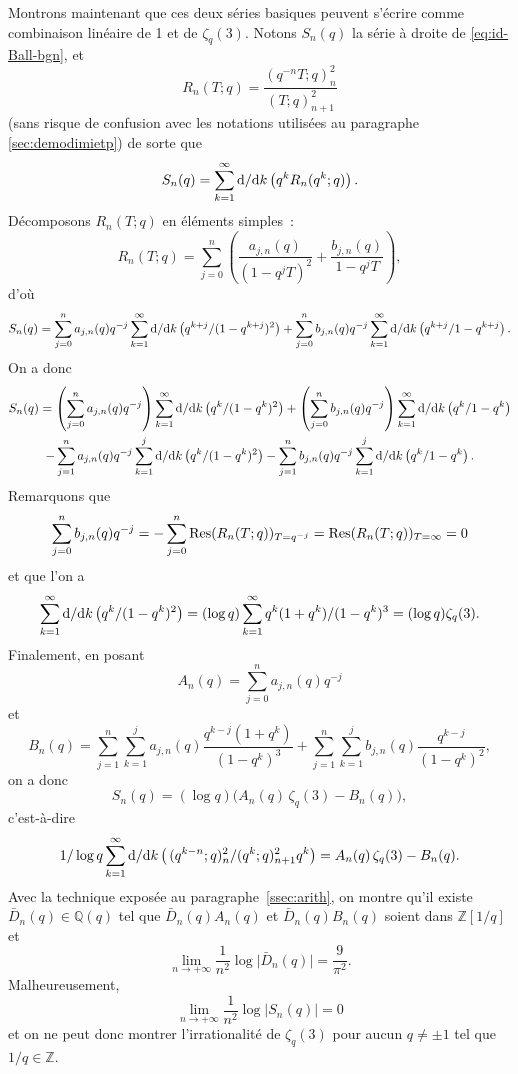 \documentclass[12pt]{amsart}
\newcommand{\io}{\infty}
\newcommand{\dd}{\textup{d}}
\theoremstyle{remark}
\numberwithin{equation}{section}
\begin{document}
Montrons maintenant que ces deux s{\'e}ries basiques peuvent s'{\'e}crire 
comme combinaison lin{\'e}aire de 1 et de $\zeta_q(3)$. Notons 
 $S_n(q)$ la s{\'e}rie {\`a} droite de \eqref{eq:id-Ball-bgn},
et 
$$
R_n(T ; q)= \frac{(q^{-n}T ; q)_n^2}{(T ; q)_{n+1}^2}
$$
(sans risque de confusion avec les notations 
utilis{\'e}es au paragraphe \ref{sec:demodimietp}) 
de sorte que 
$$
S_n(q)=
\sum_{k=1}^{\io}\frac{\dd }{\dd k}\left(q^kR_n(q^k ; q)\right).
$$
D{\'e}composons $R_n(T ; q)$ en {\'e}l{\'e}ments simples~: 
$$
R_n(T ; q)=\sum_{j=0}^n\left(\frac{a_{j,n}(q)}{(1-q^jT)^2}+\frac{b_{j,n}(q)}{1-q^jT}\right),
$$
d'o{\`u} 
$$
S_n(q)=\sum_{j=0}^n a_{j,n}(q) q^{-j}\sum_{k=1}^{\io} \frac{\dd }{\dd
    k}\left(\frac{q^{k+j}}{(1-q^{k+j})^2}\right)+
\sum_{j=0}^n b_{j,n}(q) q^{-j}\sum_{k=1}^{\io} \frac{\dd }{\dd
    k}\left(\frac{q^{k+j}}{1-q^{k+j}}\right).
$$
On a donc
\begin{multline*} 
S_n(q)=\left(\sum_{j=0}^n a_{j,n}(q) q^{-j}\right)\sum_{k=1}^{\io} \frac{\dd }{\dd
    k}\left(\frac{q^{k}}{(1-q^{k})^2}\right)+
\left(\sum_{j=0}^n b_{j,n}(q) q^{-j}\right)\sum_{k=1}^{\io} 
\frac{\dd }{\dd
    k}\left(\frac{q^{k}}{1-q^{k}}\right)\\ -\sum_{j=1}^n 
a_{j,n}(q) q^{-j}\sum_{k=1}^{j} \frac{\dd }{\dd
    k}\left(\frac{q^{k}}{(1-q^{k})^2}\right)-
\sum_{j=1}^n b_{j,n}(q) q^{-j}\sum_{k=1}^{j} \frac{\dd }{\dd
    k}\left(\frac{q^{k}}{1-q^{k}}\right).
\end{multline*}
Remarquons que 
$$
\sum_{j=0}^n b_{j,n}(q) q^{-j}=-\sum_{j=0}^n \textup{Res}(R_n( T;
q))_{T=q^{-j}}=\textup{Res}(R_n(T ; q))_{T=\io}=0
$$
et que l'on a
$$
\sum_{k=1}^{\io} \frac{\dd }{\dd
    k}\left(\frac{q^{k}}{(1-q^{k})^2}\right)= (\log q)\sum_{k=1}^{\io} 
\frac{q^{k}(1+q^k)}{(1-q^{k})^3}=(\log q)\zeta_q(3).
$$  
Finalement, en posant 
$$\displaystyle A_n(q)=\sum_{j=0}^n a_{j,n}(q) q^{-j}$$ 
et 
$$ 
B_n(q)=\sum_{j=1}^n\sum_{k=1}^{j} a_{j,n}(q) \frac{q^{k-j}(1+q^k)}{(1-q^{k})^3}+
\sum_{j=1}^n\sum_{k=1}^{j} b_{j,n}(q) \frac{q^{k-j}}{(1-q^{k})^2}, 
$$
on a donc 
$$
S_n(q)=(\log q)\bigl(A_n(q)\,\zeta_q(3)- B_n(q)\bigr), 
$$
c'est-{\`a}-dire 
\begin{equation}\label{eq:s=zetaq3}
\frac{1}{\log q}
         \sum _{k=1} ^ {\infty} \frac {\dd} {\dd k}\left(\frac{ 
          \,({\let \over / \def\frac#1#2{#1 / #2}
           q^ {k - n}}; q) _{n} ^2}{({\let \over /
          \def\frac#1#2{#1 / #2}  q^ k}; q)
          _{n+1} ^ 2} q^ k  \right)= A_n(q)\,\zeta_q(3)- B_n(q).
\end{equation}
Avec la technique expos{\'e}e au paragraphe~\ref{ssec:arith}, 
on montre qu'il existe $\bar D_n(q)\in\mathbb{Q}(q)$ tel que  
$\bar D_n(q)A_n(q)$ et $\bar D_n(q)B_n(q)$ soient dans $\mathbb{Z}[1/q]$ et 
$$
\lim_{n\to+\io}\frac{1}{n^2}\log\vert \bar D_n(q)\vert = \frac{9}{\pi^2}.
$$
Malheureusement, 
$$
\lim_{n\to+\io}\frac{1}{n^2}\log\vert S_n(q)\vert=0
$$
et on ne peut donc montrer l'irrationalit{\'e} de 
$\zeta_q(3)$ pour aucun $q\not =\pm1$ tel que $1/q\in\mathbb{Z}$. 
\end{document}
